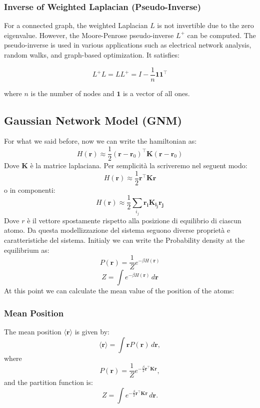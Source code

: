 \documentclass[English, Lau, oneside]{sapthesis}
\begin{document}
\begin{itemize}
\subsubsection{Inverse of Weighted Laplacian (Pseudo-Inverse)}
For a connected graph, the weighted Laplacian \( L \) is not invertible due to the zero eigenvalue. However, the Moore-Penrose pseudo-inverse \( L^+ \) can be computed. The pseudo-inverse is used in various applications such as electrical network analysis, random walks, and graph-based optimization. It satisfies:

\[
L^+ L = L L^+ = I - \frac{1}{n} \mathbf{1} \mathbf{1}^\top
\]

where \( n \) is the number of nodes and \( \mathbf{1} \) is a vector of all ones.
\subsection{Gaussian Network Model (GNM)}
For what we said before, now we can write the hamiltonian as:
\begin{equation}
    H(\mathbf{r}) \approx  \frac{1}{2} (\mathbf{r} - \mathbf{r}_0)^\top \mathbf{K} (\mathbf{r} - \mathbf{r}_0)
\end{equation}
Dove \( \mathbf{K} \) è la matrice laplaciana.
Per semplicità la scriveremo nel seguent modo:
\begin{equation}
    H(\mathbf{r}) \approx  \frac{1}{2} \mathbf{r}^\top \mathbf{K} \mathbf{r}
\end{equation}
o in componenti:
\begin{equation}
    H(\mathbf{r}) \approx  \frac{1}{2} \sum_{{i}_{j}} \mathbf{r_i} \mathbf{K_{i}_{j}} \mathbf{r_j}
\end{equation}
Dove $r$ è il vettore spostamente rispetto alla posizione di equilibrio di ciascun atomo.
Da questa modellizzazione del sistema seguono diverse proprietà e caratteristiche del sistema.
Initialy we can write the Probability density at the equilibrium as:
\begin{equation}
    P(\mathbf{r}) = \frac{1}{Z} e^{-\beta H(\mathbf{r})}
    \end{equation}
    \begin{equation}
    Z = \int e^{-\beta H(\mathbf{r})} \, d\mathbf{r}
    \end{equation}
At this point we can calculate the mean value of the position of the atoms:
\subsubsection{Mean Position}
The mean position \(\langle \bm{r} \rangle\) is given by:
\begin{equation}
\langle \bm{r} \rangle = \int \bm{r} P(\bm{r}) \, d\bm{r},
\end{equation}
where
\begin{equation}
P(\bm{r}) = \frac{1}{Z} e^{-\frac{\beta}{2} \bm{r}^\top \mathbf{K} \bm{r}},
\end{equation}
and the partition function is:
\begin{equation}
Z = \int e^{-\frac{\beta}{2} \bm{r}^\top \mathbf{K} \bm{r}} \, d\bm{r}.
\end{equation}


\end{itemize}
\end{document}
